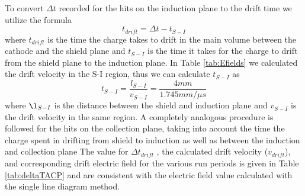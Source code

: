 To convert $\Delta t$ recorded for the hits on the induction plane to the drift time we utilize the formula
\begin{equation}
t_{drift} = \Delta t - t_{S-I}
\end{equation}
where $t_{drift}$ is the time the charge takes to drift in the main volume between the cathode and the shield plane and $t_{S-I}$ is the time it takes for the charge to drift from the shield plane to the induction plane. In Table \ref{tab:Efields} we calculated the drift velocity in the S-I region, thus we can calculate $t_{S-I}$ as 
\begin{equation}
t_{S-I} = \frac{l_{S-I}}{v_{S-I}} = \frac{4 mm}{1.745 mm/ \mu s}
\end{equation}
where $\l_{S-I}$ is the distance between the shield and induction plane and $v_{S-I}$ is the drift velocity in the same region. A completely analogous procedure is followed for the hits on the collection plane, taking into account the time the charge spent in drifting from shield to induction as well as between the induction and collection plane
The value for $\Delta t_{drift}$ , the calculated drift velocity ($v_{drift}$), and corresponding drift electric field for the various run periods is given in Table \ref{tab:deltaTACP} and are consistent with the electric field value calculated with the single line diagram method.

